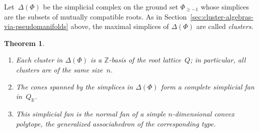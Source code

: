 \documentclass[letterpaper]{amsart}
\numberwithin{equation}{section}
\newtheorem{theorem}{Theorem}[section]
\theoremstyle{definition}
\def\ZZ{\mathbb{Z}}
\def\RR{\mathbb{R}}
\begin{document}
Let~$\Delta (\Phi)$ be the simplicial complex on the ground set 
$\Phi_{\geq -1}$ whose simplices are the subsets of mutually compatible 
roots. 
As in Section~\ref{sec:cluster-algebras-via-pseudomanifolds} above, 
the maximal simplices of $\Delta (\Phi)$ are called \emph{clusters}. 
 
\begin{theorem} 
\label{th:cluster-fan} 
{\rm \cite[Theorems~1.8,~1.10]{yga} \cite[Theorem~1.4]{cfz}} 
{\ } 
\begin{enumerate} 
\item 
Each cluster in $\Delta(\Phi)$ is a $\ZZ$-basis of the root lattice~$Q$; 
in particular, all clusters are of the same size~$n$. 
\item 
The cones spanned by the simplices in $\Delta(\Phi)$ form a complete 
simplicial fan in~$Q_\RR$. 
\item 
This simplicial fan 
is the normal fan of a simple $n$-dimension\-al convex polytope, 
the \emph{generalized associahedron} of the corresponding type. 
\end{enumerate} 
\end{theorem} 
 
\end{document}
